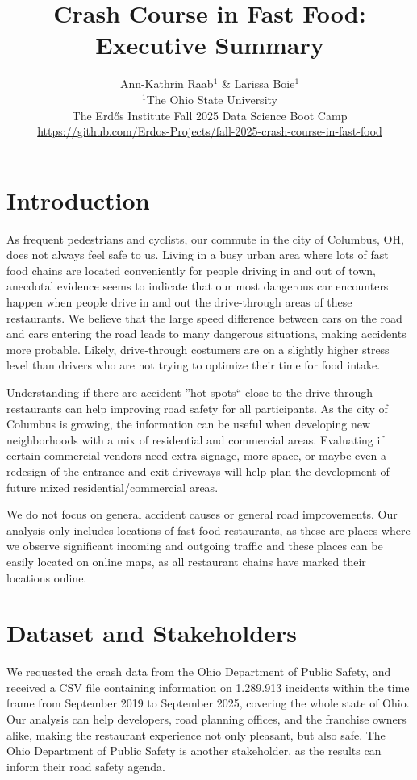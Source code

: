 \documentclass[11pt,a4paper]{article}
\title{\vspace{-80pt}Crash Course in Fast Food: Executive Summary}
\author{
  Ann-Kathrin Raab$^{1}$ \&
  Larissa Boie$^{1}$ \\
  \small $^{1}$The Ohio State University \\
  \small The Erd\H{o}s Institute Fall 2025 Data Science Boot Camp \\
  \small \url{https://github.com/Erdos-Projects/fall-2025-crash-course-in-fast-food}  
}
\date{}
\begin{document}
\maketitle
\vspace{-30pt}
\section{Introduction}
As frequent pedestrians and cyclists, our commute in the city of Columbus, OH, does not always feel safe to us. Living in a busy urban area where lots of fast food chains are located conveniently for people driving in and out of town, anecdotal evidence seems to indicate that our most dangerous car encounters happen when people drive in and out the drive-through areas of these restaurants. We believe that the large speed difference between cars on the road and cars entering the road leads to many dangerous situations, making accidents more probable. Likely, drive-through costumers are on a slightly higher stress level than drivers who are not trying to optimize their time for food intake.

Understanding if there are accident ''hot spots`` close to the drive-through restaurants can help improving road safety for all participants. As the city of Columbus is growing, the information can be useful when developing new neighborhoods with a mix of residential and commercial areas. Evaluating if certain commercial vendors need extra signage, more space, or maybe even a redesign of the entrance and exit driveways will help plan the development of future mixed residential/commercial areas. 

We do not focus on general accident causes or general road improvements. Our analysis only includes locations of fast food restaurants, as these are places where we observe significant incoming and outgoing traffic and these places can be easily located on online maps, as all restaurant chains have marked their locations online.


\section{Dataset and Stakeholders}
We requested the crash data from the Ohio Department of Public Safety, and received a CSV file containing information on 1.289.913 incidents within the time frame from September 2019 to September 2025, covering the whole state of Ohio. \\

Our analysis can help developers, road planning offices, and the franchise owners alike, making the restaurant experience not only pleasant, but also safe. The Ohio Department of Public Safety is another stakeholder, as the results can inform their road safety agenda.
\end{document}
